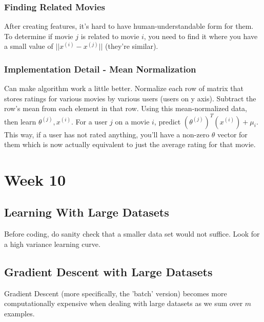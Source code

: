 \documentclass[11pt,letterpaper]{article}
\begin{document}
\subsubsection{Finding Related Movies}
After creating features, it's hard to have human-understandable form for them. To determine if movie $j$ is related to movie $i$, you need to find it where you have a small value of $||x^{(i)} - x^{(j)}||$ (they're similar).

\subsubsection{Implementation Detail - Mean Normalization}
Can make algorithm work a little better. Normalize each row of matrix that stores ratings for various movies by various users (users on y axis). Subtract the row's mean from each element in that row. Using this mean-normalized data, then learn $\theta^{(j)}, x^{(i)}$. For a user $j$ on a movie $i$, predict 
$(\theta^{(j)})^T(x^{(i)}) + \mu_i$. This way, if a user has not rated anything, you'll have a non-zero $\theta$ vector for them which is now actually equivalent to just the average rating for that movie.	

\section{Week 10}
\subsection{Learning With Large Datasets}
Before coding, do sanity check that a smaller data set would not suffice. Look for a high variance learning curve. 
\subsection{Gradient Descent with Large Datasets}
Gradient Descent (more specifically, the 'batch' version) becomes more computationally expensive when dealing with large datasets as we sum over $m$ examples. 
\end{document}
